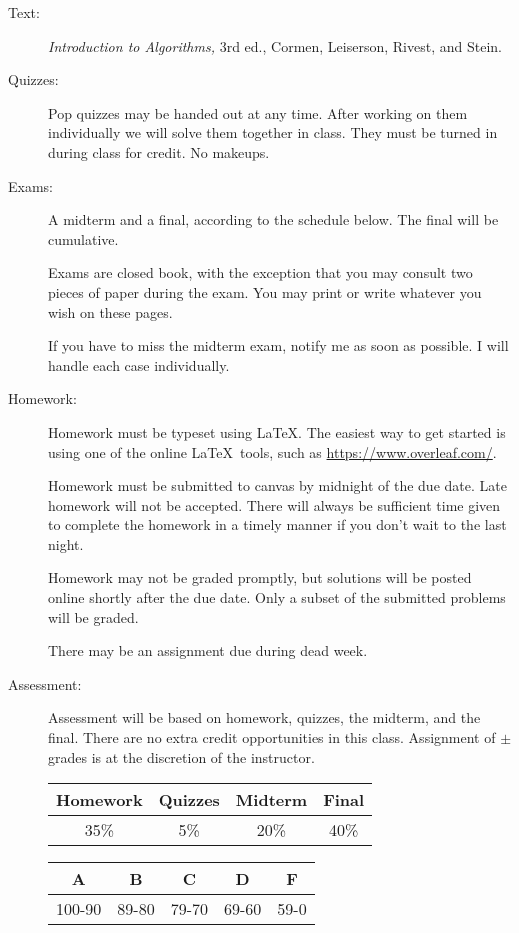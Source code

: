 \documentclass{article}
\begin{document}
\begin{description}
  \item[Text:] {\em Introduction to Algorithms,} 3rd ed., Cormen,
    Leiserson, Rivest, and Stein.


\item[Quizzes:]  Pop quizzes may be handed out at any time.  After
  working on them individually we will solve them together in class.
  They must be turned in during class for credit.  No makeups.

\item[Exams:] A midterm and a final, according to the schedule below.
  The final will be cumulative.

  Exams are closed book, with the exception that you may consult two
  pieces of paper during the exam.  You may print or write whatever
  you wish on these pages.

  If you have to miss the midterm exam, notify me as soon as
  possible.  I will handle each case individually.

\item[Homework:] Homework must be typeset using \LaTeX.  The easiest
  way to get started is using one of the online \LaTeX\ tools, such as
  \url{https://www.overleaf.com/}.

   Homework must be submitted to canvas by midnight of the due date.
   Late homework will not be accepted.  There will always be
   sufficient time given to complete the homework in a timely manner
   if you don't wait to the last night.

   Homework may not be graded promptly, but solutions will be posted
   online shortly after the due date.  Only a subset of the submitted
   problems will be graded.

   There may be an assignment due during dead week.

 \item[Assessment:] Assessment will be based on homework, quizzes, the
   midterm, and the final.  There are no extra credit opportunities in
   this class.  Assignment of $\pm$ grades is at the discretion of the
   instructor. 

   \begin{tabular}{|c|c|c|c|}\hline
     Homework & Quizzes & Midterm & Final\\\hline
       35\% & 5\% & 20\%& 40\%\\\hline
   \end{tabular}
   \hfill
   \begin{tabular}{|c|c|c|c|c|}\hline
     A & B & C & D & F\\\hline
    100-90& 89-80 & 79-70 & 69-60 & 59-0\\\hline
   \end{tabular}



\end{description}
\end{document}
